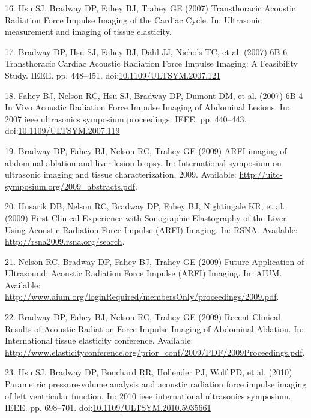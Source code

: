 \documentclass[
]{article}
\newenvironment{cslreferences}%
  {}%
  {\par}
\begin{document}
\begin{cslreferences}
\leavevmode\hypertarget{ref-Hsu2007c}{}%
16. Hsu SJ, Bradway DP, Fahey BJ, Trahey GE (2007) Transthoracic
Acoustic Radiation Force Impulse Imaging of the Cardiac Cycle. In:
Ultrasonic measurement and imaging of tissue elasticity.

\leavevmode\hypertarget{ref-Bradway2007}{}%
17. Bradway DP, Hsu SJ, Fahey BJ, Dahl JJ, Nichols TC, et al. (2007)
6B-6 Transthoracic Cardiac Acoustic Radiation Force Impulse Imaging: A
Feasibility Study. IEEE. pp. 448--451.
doi:\href{https://doi.org/10.1109/ULTSYM.2007.121}{10.1109/ULTSYM.2007.121}

\leavevmode\hypertarget{ref-Fahey2007b}{}%
18. Fahey BJ, Nelson RC, Hsu SJ, Bradway DP, Dumont DM, et al. (2007)
6B-4 In Vivo Acoustic Radiation Force Impulse Imaging of Abdominal
Lesions. In: 2007 ieee ultrasonics symposium proceedings. IEEE. pp.
440--443.
doi:\href{https://doi.org/10.1109/ULTSYM.2007.119}{10.1109/ULTSYM.2007.119}

\leavevmode\hypertarget{ref-Bradway2009}{}%
19. Bradway DP, Fahey BJ, Nelson RC, Trahey GE (2009) ARFI imaging of
abdominal ablation and liver lesion biopsy. In: International symposium
on ultrasonic imaging and tissue characterization, 2009. Available:
\url{http://uitc-symposium.org/2009_abstracts.pdf}.

\leavevmode\hypertarget{ref-Husarik2009}{}%
20. Husarik DB, Nelson RC, Bradway DP, Fahey BJ, Nightingale KR, et al.
(2009) First Clinical Experience with Sonographic Elastography of the
Liver Using Acoustic Radiation Force Impulse (ARFI) Imaging. In: RSNA.
Available: \url{http://rsna2009.rsna.org/search}.

\leavevmode\hypertarget{ref-Nelson2009}{}%
21. Nelson RC, Bradway DP, Fahey BJ, Trahey GE (2009) Future Application
of Ultrasound: Acoustic Radiation Force Impulse (ARFI) Imaging. In:
AIUM. Available:
\url{http://www.aium.org/loginRequired/membersOnly/proceedings/2009.pdf}.

\leavevmode\hypertarget{ref-Bradway2009b}{}%
22. Bradway DP, Fahey BJ, Nelson RC, Trahey GE (2009) Recent Clinical
Results of Acoustic Radiation Force Impulse Imaging of Abdominal
Ablation. In: International tissue elasticity conference. Available:
\url{http://www.elasticityconference.org/prior_conf/2009/PDF/2009Proceedings.pdf}.

\leavevmode\hypertarget{ref-Hsu2010}{}%
23. Hsu SJ, Bradway DP, Bouchard RR, Hollender PJ, Wolf PD, et al.
(2010) Parametric pressure-volume analysis and acoustic radiation force
impulse imaging of left ventricular function. In: 2010 ieee
international ultrasonics symposium. IEEE. pp. 698--701.
doi:\href{https://doi.org/10.1109/ULTSYM.2010.5935661}{10.1109/ULTSYM.2010.5935661}


\end{cslreferences}
\end{document}
